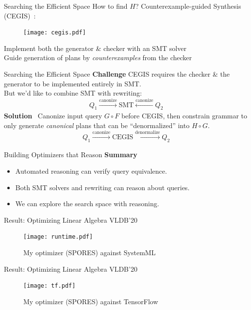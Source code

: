 \documentclass{beamer}
\begin{document}
  \begin{frame}{Searching the Efficient Space}
    How to find $H$? Counterexample-guided Synthesis (CEGIS)~\cite{sketch}:
    \begin{figure}
      \texttt{[image: cegis.pdf]}
    \end{figure}
    Implement both the generator \& checker with an SMT solver \\
    Guide generation of plans by {\em counterexamples} from the checker
  \end{frame}

  \begin{frame}{Searching the Efficient Space}
    \textbf{Challenge} CEGIS requires the checker \& the generator to 
    be implemented entirely in SMT. \pause \\
    But we'd like to combine SMT with rewriting:
    \[Q_1 \xrightarrow[]{\text{canonize}} \text{SMT} \xleftarrow[]{\text{canonize}} Q_2\]\pause
    \textbf{Solution}~\cite{dove} Canonize input query $G \circ F$ before CEGIS,
    then constrain grammar to only generate {\em canonical} plans that 
    can be ``denormalized'' into $H\circ G$.
    \[Q_1 \xrightarrow[]{\text{canonize}} \text{CEGIS} \xrightarrow[]{\text{denormalize}} Q_2\]
  \end{frame}

  \begin{frame}{Building Optimizers that Reason}
    \textbf{Summary}
    \begin{itemize}
      \item Automated reasoning can verify query equivalence.
      \item Both SMT solvers and rewriting can reason about queries.
      \item We can explore the search space with reasoning.
    \end{itemize}
  \end{frame}

  \begin{frame}{Result: Optimizing Linear Algebra}
    VLDB'20~\cite{spores}
    \begin{figure}
        \texttt{[image: runtime.pdf]}
        \caption*{My optimizer (SPORES) against SystemML}
    \end{figure}
  \end{frame}

  \begin{frame}{Result: Optimizing Linear Algebra}
    VLDB'20~\cite{spores}
    \begin{figure}
      \texttt{[image: tf.pdf]}
      \caption*{My optimizer (SPORES) against TensorFlow}
    \end{figure}
  \end{frame}
\end{document}
